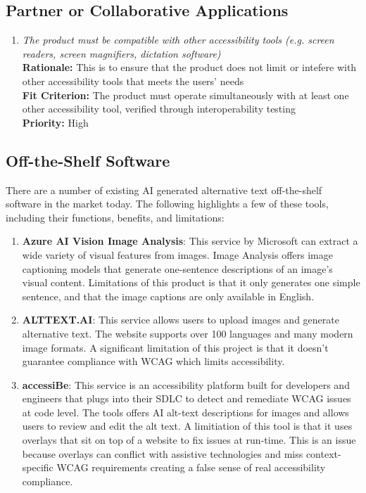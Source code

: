 \documentclass[12pt]{article}
\begin{document}
\subsection{Partner or Collaborative Applications}
\begin{enumerate}[label=MD-PA \arabic*., wide=0pt, leftmargin=*]
  \item \emph{The product must be compatible with other accessibility tools (e.g. screen readers, screen magnifiers, dictation software)}\\[2mm]
    {\bf Rationale:} This is to ensure that the product does not limit or intefere with other accessibility tools that 
    meets the users' needs \\
    {\bf Fit Criterion:} The product must operate simultaneously with at least one other accessibility tool,
    verified through interoperability testing \\
    {\bf Priority:} High
\end{enumerate}
\subsection{Off-the-Shelf Software}
There are a number of existing AI generated alternative text off-the-shelf software in the market today. The following 
highlights a few of these tools, including their functions, benefits, and limitations: 
\begin{enumerate}
  \item \textbf{Azure AI Vision Image Analysis}: This service by Microsoft can extract a wide variety of 
  visual features from images. Image Analysis offers image captioning models that generate one-sentence descriptions of an image's visual content.
  Limitations of this product is that it only generates one simple sentence, and that the image
  captions are only available in English.
  \item \textbf{ALTTEXT.AI}: This service allows users to upload images and generate alternative text. The website supports
  over 100 languages and many modern image formats. A significant limitation of this project
  is that it doesn't guarantee compliance with WCAG which limits accessibility.
  \item \textbf{accessiBe}: This service is an accessibility platform built for developers and engineers that plugs into their SDLC to detect and 
  remediate WCAG issues at code level. The tools offers AI alt-text descriptions for images and allows users to review 
  and edit the alt text. A limitiation of this tool is that it uses overlays that sit on top of a website to fix issues at run-time. This is an issue 
  because overlays can conflict with assistive technologies and miss context-specific WCAG requirements creating a false sense of real accessibility compliance.
\end{enumerate}
\end{document}
